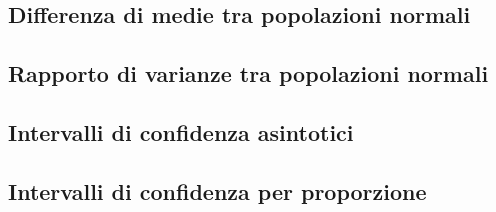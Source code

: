         \subsection{Differenza di medie tra popolazioni normali}
            \begin{defn}
                
            \end{defn}
        \subsection{Rapporto di varianze tra popolazioni normali}
        \subsection{Intervalli di confidenza asintotici}
        \subsection{Intervalli di confidenza per proporzione}
        
